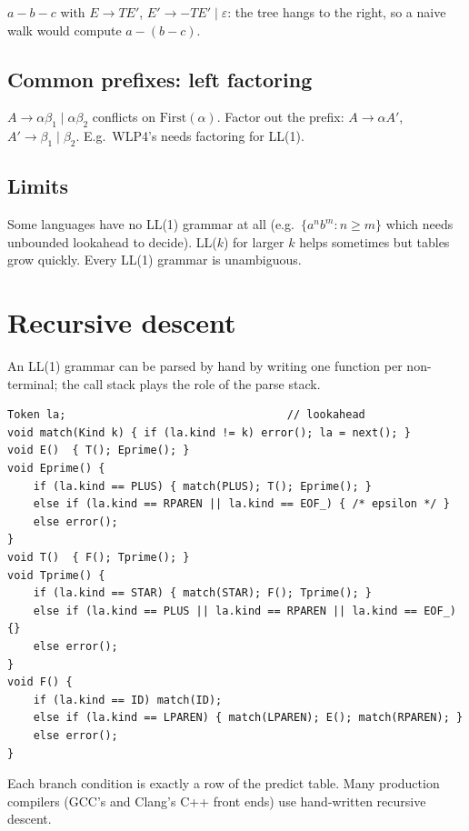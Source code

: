 \begin{center}

\small $a-b-c$ with $E\to TE'$, $E'\to -TE'\mid\varepsilon$: the tree hangs to the right,
so a naive walk would compute $a-(b-c)$.
\end{center}

\subsection{Common prefixes: left factoring}
$A \to \alpha\beta_1 \mid \alpha\beta_2$ conflicts on $\mathrm{First}(\alpha)$. Factor out
the prefix: $A \to \alpha A'$, $A' \to \beta_1 \mid \beta_2$. E.g.\ WLP4's
 needs factoring for LL(1).

\subsection{Limits}
Some languages have no LL(1) grammar at all (e.g.\ $\{a^nb^m : n\ge m\}$ which needs
unbounded lookahead to decide). LL($k$) for larger $k$ helps sometimes but tables grow
quickly. Every LL(1) grammar is unambiguous.

\section{Recursive descent}

An LL(1) grammar can be parsed by hand by writing one function per non-terminal; the call
stack plays the role of the parse stack.
\begin{lstlisting}[style=cpp]
Token la;                                  // lookahead
void match(Kind k) { if (la.kind != k) error(); la = next(); }
void E()  { T(); Eprime(); }
void Eprime() {
    if (la.kind == PLUS) { match(PLUS); T(); Eprime(); }
    else if (la.kind == RPAREN || la.kind == EOF_) { /* epsilon */ }
    else error();
}
void T()  { F(); Tprime(); }
void Tprime() {
    if (la.kind == STAR) { match(STAR); F(); Tprime(); }
    else if (la.kind == PLUS || la.kind == RPAREN || la.kind == EOF_) {}
    else error();
}
void F() {
    if (la.kind == ID) match(ID);
    else if (la.kind == LPAREN) { match(LPAREN); E(); match(RPAREN); }
    else error();
}
\end{lstlisting}
Each branch condition is exactly a row of the predict table. Many production compilers
(GCC's and Clang's C++ front ends) use hand-written recursive descent.

